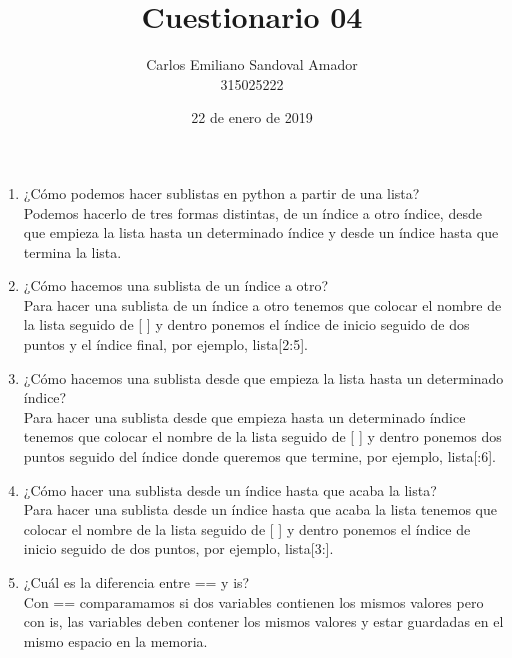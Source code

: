 \documentclass[letterpaper, 12pt, oneside]{article}%
\title{Cuestionario 04}
\author{Carlos Emiliano Sandoval Amador \\ 315025222}
\date{22 de enero de 2019}
\begin{document}
	\maketitle
	\begin{enumerate}
		\item ¿Cómo podemos hacer sublistas en python a partir de una lista? \\ Podemos hacerlo de tres formas distintas, de un índice a otro índice, desde que empieza la lista hasta un determinado índice y desde un índice hasta que termina la lista.
		\item ¿Cómo hacemos una sublista de un índice a otro? \\ Para hacer una sublista de un índice a otro tenemos que colocar el nombre de la lista seguido de [ ] y dentro ponemos el índice de inicio seguido de dos puntos y el índice final, por ejemplo, lista[2:5].
		\item ¿Cómo hacemos una sublista desde que empieza la lista hasta un determinado índice? \\ Para hacer una sublista desde que empieza hasta un determinado índice tenemos que colocar el nombre de la lista seguido de [ ] y dentro ponemos dos puntos seguido del índice donde queremos que termine, por ejemplo, lista[:6].
		\item ¿Cómo hacer una sublista desde un índice hasta que acaba la lista? \\ Para hacer una sublista desde un índice hasta que acaba la lista tenemos que colocar el nombre de la lista seguido de [ ] y dentro ponemos el índice de inicio seguido de dos puntos, por ejemplo, lista[3:].
		\item ¿Cuál es la diferencia entre == y is? \\ Con == comparamamos si dos variables contienen los mismos valores pero con is, las variables deben contener los mismos valores y estar guardadas en el mismo espacio en la memoria.
	\end{enumerate}
\end{document}
